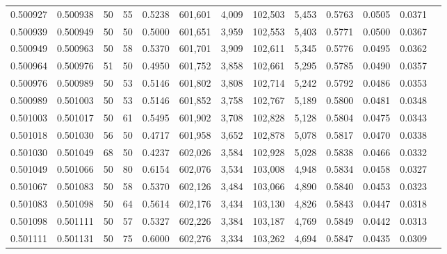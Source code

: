 \begin{tabular}{rrrrrrrrrrrrr}
0.500927 & 0.500938 &    50 &  55 &                                     0.5238 & 601,601 &   4,009 & 102,503 &   5,453 & 0.5763 & 0.0505 & 0.0371 \\
0.500939 & 0.500949 &    50 &  50 &                                     0.5000 & 601,651 &   3,959 & 102,553 &   5,403 & 0.5771 & 0.0500 & 0.0367 \\
0.500949 & 0.500963 &    50 &  58 &                                     0.5370 & 601,701 &   3,909 & 102,611 &   5,345 & 0.5776 & 0.0495 & 0.0362 \\
0.500964 & 0.500976 &    51 &  50 &                                     0.4950 & 601,752 &   3,858 & 102,661 &   5,295 & 0.5785 & 0.0490 & 0.0357 \\
0.500976 & 0.500989 &    50 &  53 &                                     0.5146 & 601,802 &   3,808 & 102,714 &   5,242 & 0.5792 & 0.0486 & 0.0353 \\
0.500989 & 0.501003 &    50 &  53 &                                     0.5146 & 601,852 &   3,758 & 102,767 &   5,189 & 0.5800 & 0.0481 & 0.0348 \\
0.501003 & 0.501017 &    50 &  61 &                                     0.5495 & 601,902 &   3,708 & 102,828 &   5,128 & 0.5804 & 0.0475 & 0.0343 \\
0.501018 & 0.501030 &    56 &  50 &                                     0.4717 & 601,958 &   3,652 & 102,878 &   5,078 & 0.5817 & 0.0470 & 0.0338 \\
0.501030 & 0.501049 &    68 &  50 &                                     0.4237 & 602,026 &   3,584 & 102,928 &   5,028 & 0.5838 & 0.0466 & 0.0332 \\
0.501049 & 0.501066 &    50 &  80 &                                     0.6154 & 602,076 &   3,534 & 103,008 &   4,948 & 0.5834 & 0.0458 & 0.0327 \\
0.501067 & 0.501083 &    50 &  58 &                                     0.5370 & 602,126 &   3,484 & 103,066 &   4,890 & 0.5840 & 0.0453 & 0.0323 \\
0.501083 & 0.501098 &    50 &  64 &                                     0.5614 & 602,176 &   3,434 & 103,130 &   4,826 & 0.5843 & 0.0447 & 0.0318 \\
0.501098 & 0.501111 &    50 &  57 &                                     0.5327 & 602,226 &   3,384 & 103,187 &   4,769 & 0.5849 & 0.0442 & 0.0313 \\
0.501111 & 0.501131 &    50 &  75 &                                     0.6000 & 602,276 &   3,334 & 103,262 &   4,694 & 0.5847 & 0.0435 & 0.0309 \\

\end{tabular}

